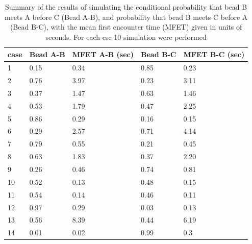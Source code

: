 \documentclass[12pt]{paper}
\begin{document}
\begin{table}

\begin{tabular}{l|l|l|l|l}
case & Bead A-B & MFET A-B (sec)&Bead B-C & MFET B-C (sec)\\
 \hline
1 & 0.15 & 0.34 & 0.85 & 0.23\\
2 & 0.76 & 3.97 & 0.23 & 3.11\\
3 & 0.37 & 1.47 & 0.63 & 1.46\\
4 & 0.53 & 1.79 & 0.47 & 2.25\\
5 & 0.86 & 0.29 & 0.16 & 0.15\\
6 & 0.29 & 2.57 & 0.71 & 4.14\\
7 & 0.79 & 0.55 & 0.21 & 0.45\\
8 & 0.63 & 1.83 & 0.37 & 2.20\\
9 & 0.26 & 0.46 & 0.74 & 0.81\\
10& 0.52 & 0.13 & 0.48 & 0.15\\
11& 0.54 & 0.14 & 0.46 & 0.11\\
12& 0.97 & 0.29 & 0.03 & 0.13\\
13& 0.56 & 8.39 & 0.44 & 6.19\\
14& 0.01 & 0.02 & 0.99 & 0.3
\end{tabular}
\caption{\scriptsize{Summary of the results of simulating the conditional probability that bead B meets A before C (Bead A-B), and probability that bead B meets C before A (Bead B-C), with the mean first encounter time (MFET) given in units of seconds. For each cse 10 simulation were performed}}\label{conditionalEncouterProbabilityAndMFET}
\end{table} 
\end{document}
